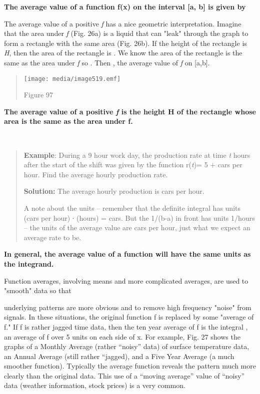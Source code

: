 \textbf{The average value of a function f(x) on the interval {[}a, b{]}
is given by}

The average value of a positive \emph{f} has a nice geometric
interpretation. Imagine that the area under \emph{f} (Fig. 26a) is a
liquid that can "leak" through the graph to form a rectangle with the
same area (Fig. 26b). If the height of the rectangle is \emph{H}, then
the area of the rectangle is . We know the area of the rectangle is the
same as the area under \emph{f} so . Then , the average value of
\emph{f} on {[}a,b{]}.

\begin{quote}
\texttt{[image: media/image519.emf]}

Figure 97
\end{quote}

\textbf{The average value of a positive \emph{f} is the height H of the
rectangle whose area is the same as the area under f.}

\textbf{\\
}

\begin{quote}
\textbf{Example}: During a 9 hour work day, the production rate at time
\emph{t} hours after the start of the shift was given by the function
r(\emph{t})= 5 + cars per hour. Find the average hourly production rate.

\textbf{Solution:} The average hourly production is cars per hour.

A note about the units -- remember that the definite integral has units
(cars per hour) ∙ (hours) = cars. But the 1/(b-a) in front has units
1/hours -- the units of the average value are cars per hour, just what
we expect an average rate to be.
\end{quote}

\textbf{In general, the average value of a function will have the same
units as the integrand.}

Function averages, involving means and more complicated averages, are
used to "smooth" data so that

underlying patterns are more obvious and to remove high frequency
"noise" from signals. In these situations, the original function f is
replaced by some "average of f." If f is rather jagged time data, then
the ten year average of f is the integral , an average of f over 5 units
on each side of x. For example, Fig. 27 shows the graphs of a Monthly
Average (rather ``noisy'' data) of surface temperature data, an Annual
Average (still rather ``jagged), and a Five Year Average (a much
smoother function). Typically the average function reveals the pattern
much more clearly than the original data. This use of a ``moving
average'' value of ``noisy'' data (weather information, stock prices) is
a very common.

